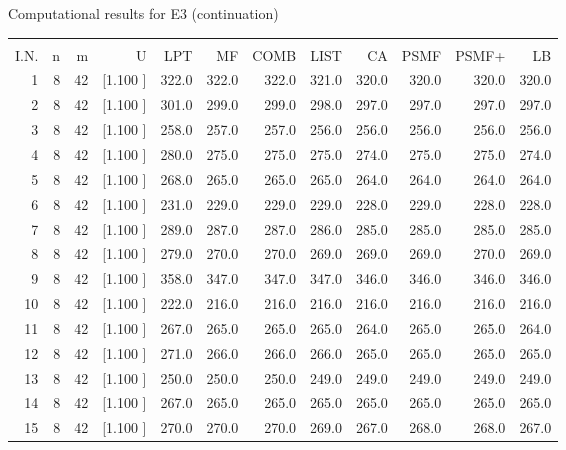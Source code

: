 \documentclass[12pt,a4paper]{article}
\begin{document}
\newpage
\begin{center}
 Computational results for E3 (continuation) {\tiny
\begin{tabular}{r r r r r r r r r r r r}\hline
    &   &   &          &        &        &        &        &        &        &        &       \\[-0.1in]
  I.N.  &  n  &  m  &  U  &  LPT  &  MF  &  COMB  &  LIST  &  CA  & PSMF &PSMF+ & LB \\[0.03in]
\hline
   1&  8& 42&[1.100     ]&   322.0&   322.0&   322.0&   321.0&   320.0&   320.0&   320.0&   320.0\\[-0.02in]
   2&  8& 42&[1.100     ]&   301.0&   299.0&   299.0&   298.0&   297.0&   297.0&   297.0&   297.0\\[-0.02in]
   3&  8& 42&[1.100     ]&   258.0&   257.0&   257.0&   256.0&   256.0&   256.0&   256.0&   256.0\\[-0.02in]
   4&  8& 42&[1.100     ]&   280.0&   275.0&   275.0&   275.0&   274.0&   275.0&   275.0&   274.0\\[-0.02in]
   5&  8& 42&[1.100     ]&   268.0&   265.0&   265.0&   265.0&   264.0&   264.0&   264.0&   264.0\\[-0.02in]
   6&  8& 42&[1.100     ]&   231.0&   229.0&   229.0&   229.0&   228.0&   229.0&   228.0&   228.0\\[-0.02in]
   7&  8& 42&[1.100     ]&   289.0&   287.0&   287.0&   286.0&   285.0&   285.0&   285.0&   285.0\\[-0.02in]
   8&  8& 42&[1.100     ]&   279.0&   270.0&   270.0&   269.0&   269.0&   269.0&   270.0&   269.0\\[-0.02in]
   9&  8& 42&[1.100     ]&   358.0&   347.0&   347.0&   347.0&   346.0&   346.0&   346.0&   346.0\\[-0.02in]
  10&  8& 42&[1.100     ]&   222.0&   216.0&   216.0&   216.0&   216.0&   216.0&   216.0&   216.0\\[-0.02in]
  11&  8& 42&[1.100     ]&   267.0&   265.0&   265.0&   265.0&   264.0&   265.0&   265.0&   264.0\\[-0.02in]
  12&  8& 42&[1.100     ]&   271.0&   266.0&   266.0&   266.0&   265.0&   265.0&   265.0&   265.0\\[-0.02in]
  13&  8& 42&[1.100     ]&   250.0&   250.0&   250.0&   249.0&   249.0&   249.0&   249.0&   249.0\\[-0.02in]
  14&  8& 42&[1.100     ]&   267.0&   265.0&   265.0&   265.0&   265.0&   265.0&   265.0&   265.0\\[-0.02in]
  15&  8& 42&[1.100     ]&   270.0&   270.0&   270.0&   269.0&   267.0&   268.0&   268.0&   267.0\\[-0.02in]

\end{tabular}}
\end{center}
\end{document}
